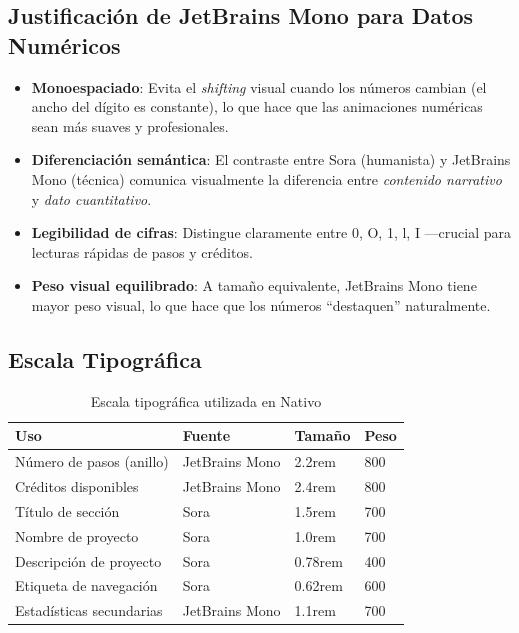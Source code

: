 \documentclass[12pt, a4paper]{article}
\begin{document}
\subsection{Justificación de JetBrains Mono para Datos Numéricos}

\begin{justificacionbox}
\begin{itemize}
  \item \textbf{Monoespaciado}: Evita el \textit{shifting} visual cuando los números cambian (el ancho del dígito es constante), lo que hace que las animaciones numéricas sean más suaves y profesionales.
  \item \textbf{Diferenciación semántica}: El contraste entre Sora (humanista) y JetBrains Mono (técnica) comunica visualmente la diferencia entre \textit{contenido narrativo} y \textit{dato cuantitativo}.
  \item \textbf{Legibilidad de cifras}: Distingue claramente entre 0, O, 1, l, I —crucial para lecturas rápidas de pasos y créditos.
  \item \textbf{Peso visual equilibrado}: A tamaño equivalente, JetBrains Mono tiene mayor peso visual, lo que hace que los números ``destaquen'' naturalmente.
\end{itemize}
\end{justificacionbox}

\subsection{Escala Tipográfica}

\begin{table}[H]
\centering
\caption{Escala tipográfica utilizada en Nativo}
\begin{tabular}{llll}
\toprule
\textbf{Uso} & \textbf{Fuente} & \textbf{Tamaño} & \textbf{Peso} \\
\midrule
Número de pasos (anillo) & JetBrains Mono & 2.2rem & 800 \\
Créditos disponibles     & JetBrains Mono & 2.4rem & 800 \\
Título de sección        & Sora           & 1.5rem & 700 \\
Nombre de proyecto       & Sora           & 1.0rem & 700 \\
Descripción de proyecto  & Sora           & 0.78rem & 400 \\
Etiqueta de navegación   & Sora           & 0.62rem & 600 \\
Estadísticas secundarias & JetBrains Mono & 1.1rem & 700 \\
\bottomrule
\end{tabular}
\end{table}
\end{document}
